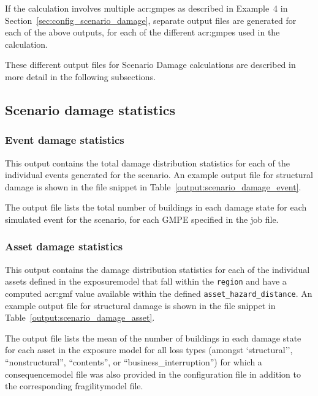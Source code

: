 If the calculation involves multiple \glspl{acr:gmpe} as described in
Example~4 in Section~\ref{sec:config_scenario_damage}, separate output files
are generated for each of the above outputs, for each of the different
\glspl{acr:gmpe} used in the calculation.

These different output files for Scenario Damage calculations are described in
more detail in the following subsections.


\subsection{Scenario damage statistics}
\label{subsec:scenario_damage_statistics}

\subsubsection{Event damage statistics}
\label{subsubsec:scenario_event_damage_statistics}

This output contains the total damage distribution statistics for each of the
individual events generated for the scenario. An example output file for
structural damage is shown in the file snippet in 
Table~\ref{output:scenario_damage_event}.



The output file lists the total number of buildings in each damage state 
for each simulated event for the scenario, for each GMPE specified in the
job file.


\subsubsection{Asset damage statistics}
\label{subsubsec:scenario_asset_damage_statistics}

This output contains the damage distribution statistics for each of the
individual \glspl{asset} defined in the \gls{exposuremodel} that fall within
the \Verb+region+ and have a computed \gls{acr:gmf} value available
within the defined \Verb+asset_hazard_distance+. An example output file for
structural damage is shown in the file snippet in 
Table~\ref{output:scenario_damage_asset}.



The output file lists the mean of the number
of buildings in each damage state for each asset in the exposure model
for all loss types (amongst `structural'', ``nonstructural'', ``contents'', or
``business\_interruption'') for which a \gls{consequencemodel} file was also
provided in the configuration file in addition to the corresponding
\gls{fragilitymodel} file.


